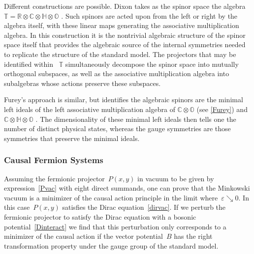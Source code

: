 \documentclass[reqno,11pt]{amsart}
\numberwithin{equation}{section}
\newcommand{\1}{\mbox{\rm 1 \hspace{-1.05 em} 1}}
\newcommand{\bb}[1]{\mathbb{#1}}
\begin{document}
Different constructions are possible. Dixon takes as the spinor space the algebra ~$\bb{T}=\mathbb{R}\otimes\mathbb{C}\otimes\mathbb{H}\otimes\mathbb{O}$ \cite{dixon2013division}. Such spinors are acted upon from the left or right by the algebra itself, with these linear maps generating the associative multiplication algebra. In this construction it is the nontrivial algebraic structure of the spinor space itself that provides the algebraic source of the internal symmetries needed to replicate the structure of the standard model. The projectors that may be identified within  ~$\bb{T}$ simultaneously decompose the spinor space into mutually orthogonal subspaces, as well as the associative multiplication algebra into subalgebras whose actions preserve these subspaces. 

Furey's approach is similar, but identifies the algebraic spinors are the minimal left ideals of the left associative multiplication algebra of $\bb{C}\otimes\bb{O}$ (see \ref{Furey}) and $\bb{C}\otimes\bb{H}\otimes\bb{O}$ \cite{furey2016standard,furey231}. The dimensionality of these minimal left ideals then tells one the number of distinct physical states, whereas the gauge symmetries are those symmetries that preserve the minimal ideals. 


\subsubsection{Causal Fermion Systems}
Assuming the fermionic projector~$P(x,y)$ in vacuum to be given by expression~\eqref{Pvac} with eight direct summands, one can prove that the Minkowski vacuum is a minimizer of the causal action principle in the limit where~$\varepsilon \searrow 0$. In this case~$P(x,y)$ satisfies the Dirac equation~\eqref{dirvac}. If we perturb the fermionic projector to satisfy the Dirac equation with a bosonic potential~\eqref{Dinteract} we find that this perturbation only corresponds to a minimizer of the causal action if the vector potential~$B$ has the right transformation property under the gauge group of the standard model.
\end{document}
